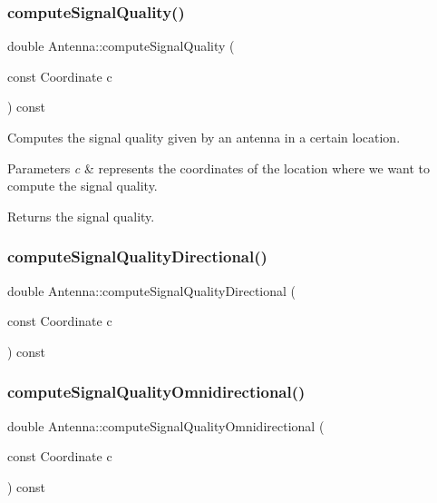 \subsubsection{\texorpdfstring{compute\+Signal\+Quality()}{computeSignalQuality()}\hspace{0.1cm}{\footnotesize\ttfamily [2/2]}}
{\footnotesize\ttfamily double Antenna\+::compute\+Signal\+Quality (\begin{DoxyParamCaption}\item[{const Coordinate}]{c }\end{DoxyParamCaption}) const}

Computes the signal quality given by an antenna in a certain location. 
\begin{DoxyParams}{Parameters}
{\em c} & represents the coordinates of the location where we want to compute the signal quality. \\
\hline
\end{DoxyParams}
\begin{DoxyReturn}{Returns}
the signal quality. 
\end{DoxyReturn}
\mbox{\label{class_antenna_a0bba3b0a586d5dc36397c2b9887cd42b}} 
\subsubsection{\texorpdfstring{compute\+Signal\+Quality\+Directional()}{computeSignalQualityDirectional()}}
{\footnotesize\ttfamily double Antenna\+::compute\+Signal\+Quality\+Directional (\begin{DoxyParamCaption}\item[{const Coordinate}]{c }\end{DoxyParamCaption}) const\hspace{0.3cm}{\ttfamily [private]}}

\mbox{\label{class_antenna_a036e212fda08a9fc5215732378fc4fbd}} 
\subsubsection{\texorpdfstring{compute\+Signal\+Quality\+Omnidirectional()}{computeSignalQualityOmnidirectional()}}
{\footnotesize\ttfamily double Antenna\+::compute\+Signal\+Quality\+Omnidirectional (\begin{DoxyParamCaption}\item[{const Coordinate}]{c }\end{DoxyParamCaption}) const\hspace{0.3cm}{\ttfamily [private]}}

